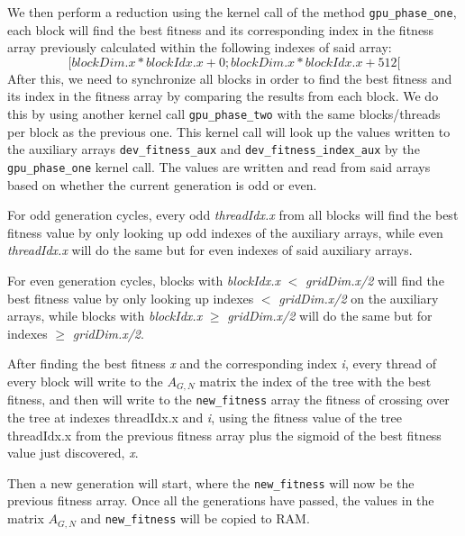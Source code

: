 \documentclass[runningheads]{llncs}
\begin{document}
We then perform a reduction using the kernel call of the method \texttt{gpu\_phase\_one}, each block will find the best fitness and its corresponding index in the fitness array previously calculated within the following indexes of said array: $$[\textit{blockDim.x} * \textit{blockIdx.x} + 0; \textit{blockDim.x} * \textit{blockIdx.x} + 512[$$
After this, we need to synchronize all blocks in order to find the best fitness and its index in the fitness array by comparing the results from each block. We do this by using another kernel call \texttt{gpu\_phase\_two} with the same blocks/threads per block as the previous one. This kernel call will look up the values written to the auxiliary arrays \texttt{dev\_fitness\_aux} and \texttt{dev\_fitness\_index\_aux} by the \texttt{gpu\_phase\_one} kernel call. The values are written and read from said arrays based on whether the current generation is odd or even.

For odd generation cycles, every odd \textit{threadIdx.x} from all blocks will find the best fitness value by only looking up odd indexes of the auxiliary arrays, while even \textit{threadIdx.x} will do the same but for even indexes of said auxiliary arrays.

For even generation cycles, blocks with \textit{blockIdx.x} $<$ \textit{gridDim.x/2} will find the best fitness value by only looking up indexes $<$ \textit{gridDim.x/2} on the auxiliary arrays, while blocks with \textit{blockIdx.x} $\geq$ \textit{gridDim.x/2} will do the same but for indexes $\geq$ \textit{gridDim.x/2}.

After finding the best fitness \textit{x} and the corresponding index \textit{i}, every thread of every block will write to the $A_{G,N}$ matrix the index of the tree with the best fitness, and then will write to the \texttt{new\_fitness} array the fitness of crossing over the tree at indexes threadIdx.x and \textit{i}, using the fitness value of the tree threadIdx.x from the previous fitness array plus the sigmoid of the best fitness value just discovered, \textit{x}.

Then a new generation will start, where the \texttt{new\_fitness} will now be the previous fitness array. Once all the generations have passed, the values in the matrix $A_{G,N}$ and \texttt{new\_fitness} will be copied to RAM.
\end{document}
